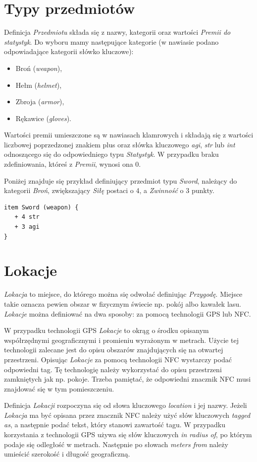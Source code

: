 \documentclass[openright]{xmgr}
\begin{document}
\section{Typy przedmiotów}
Definicja \textit{Przedmiotu} składa się z nazwy, kategorii oraz wartości \textit{Premii do statystyk}. Do wyboru mamy następujące kategorie (w nawiasie podano odpowiadające kategorii słówko kluczowe):
\begin{itemize}
	\item Broń (\textit{weapon}),
	\item Hełm (\textit{helmet}),
	\item Zbroja (\textit{armor}),
	\item Rękawice (\textit{gloves}).
\end{itemize}
Wartości premii umieszczone są w nawiasach klamrowych i składają się z wartości liczbowej poprzedzonej znakiem plus oraz słówka kluczowego \textit{agi}, \textit{str} lub \textit{int} odnoszącego się do odpowiedniego typu \textit{Statystyk}. W przypadku braku zdefiniowania, któreś z \textit{Premii}, wynosi ona 0.

Poniżej znajduje się przykład definiujący przedmiot typu \textit{Sword}, należący do kategorii \textit{Broń}, zwiększający \textit{Siłę} postaci o 4, a \textit{Zwinność} o 3 punkty.
\begin{verbatim}
item Sword (weapon) {
   + 4 str
   + 3 agi
}
\end{verbatim}

\section{Lokacje}
\textit{Lokacja} to miejsce, do którego można się odwołać definiując \textit{Przygodę}. Miejsce takie oznacza pewien obszar w fizycznym świecie np. pokój albo kawałek lasu. \textit{Lokacje} można definiować na dwa sposoby: za pomocą technologii GPS lub NFC. 

W przypadku technologii GPS \textit{Lokacje} to okrąg o środku opisanym współrzędnymi geograficznymi i promieniu wyrażonym w metrach. Użycie tej technologii zalecane jest do opisu obszarów znajdujących się na otwartej przestrzeni.
Opisując \textit{Lokacje} za pomocą technologii NFC wystarczy podać odpowiedni tag. Tę technologię należy wykorzystać do opisu przestrzeni zamkniętych jak np. pokoje. Trzeba pamiętać, że odpowiedni znacznik NFC musi znajdować się w tym pomieszczeniu.

Definicja \textit{Lokacji} rozpoczyna się od słowa kluczowego \textit{location} i jej nazwy. Jeżeli \textit{Lokacja} ma być opisana przez znacznik NFC należy użyć słów kluczowych \textit{tagged as}, a następnie podać tekst, który stanowi zawartość tagu. W przypadku korzystania z technologii GPS używa się słów kluczowych \textit{in radius of}, po którym podaje się odległość w metrach. Następnie po słowach \textit{meters from} należy umieścić szerokość i długość geograficzną.
\end{document}
